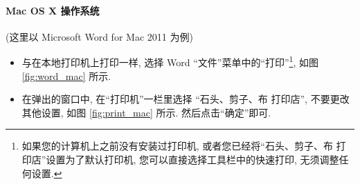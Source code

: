 \documentclass{article}
\begin{document}
\begin{CJK}{UTF8}{gbsn}
			\paragraph{Mac OS X 操作系统}
				(这里以 Microsoft Word for Mac 2011 为例)
				\begin{itemize}
					\item{与在本地打印机上打印一样, 选择 Word ``文件''菜单中的``打印''\footnote{如果您的计算机上之前没有安装过打印机, 或者您已经将``石头、剪子、布 打印店''设置为了默认打印机, 您可以直接选择工具栏中的快速打印, 无须调整任何设置.}, 如图 \ref{fig:word_mac} 所示.}
					\item{在弹出的窗口中, 在``打印机''一栏里选择 ``石头、剪子、布 打印店'', 不要更改其他设置, 如图 \ref{fig:print_mac} 所示. 然后点击``确定''即可.}
				\end{itemize}
				

\end{CJK}
\end{document}
